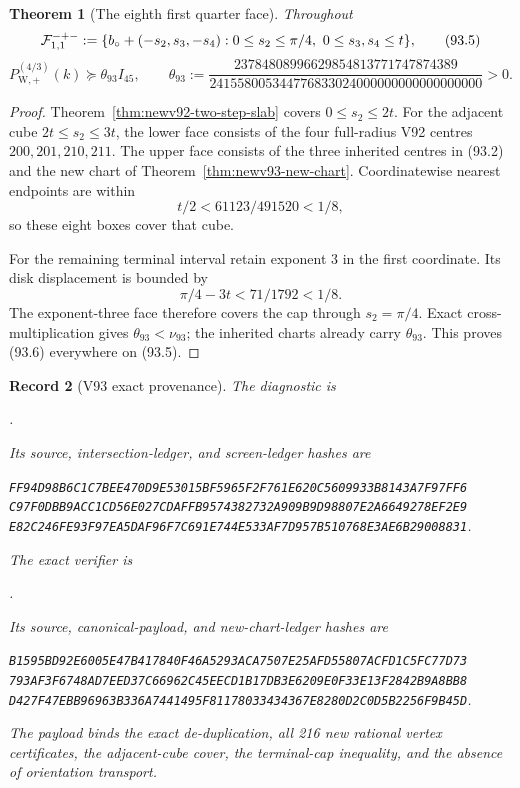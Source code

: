 \documentclass[11pt,oneside]{article}
\newtheorem{theorem}{Theorem}[section]
\newtheorem{record}[theorem]{Record}
\theoremstyle{definition}
\theoremstyle{remark}
\begin{document}
\begin{theorem}[The eighth first quarter face]
\label{thm:newv93-first-quarter-face}
Throughout
\[
 {\cal F}^{-+-}_{1,1}:=
 \{b_\circ+(-s_2,s_3,-s_4):
 0\leq s_2\leq\pi/4,\ 0\leq s_3,s_4\leq t\},         \tag{93.5}
\]
\[
 P_{\mathrm W,+}^{(4/3)}(k)
 \succeq\theta_{93}I_{45},\qquad
 \theta_{93}:=
 \frac{23784808996629854813771747874389}
 {241558005344776833024000000000000000000}>0.         \tag{93.6}
\]
\end{theorem}

\begin{proof}
Theorem~\ref{thm:newv92-two-step-slab} covers
\(0\leq s_2\leq2t\).  For the adjacent cube
\(2t\leq s_2\leq3t\), the lower face consists of the four
full-radius V92 centres \(200,201,210,211\).  The upper face
consists of the three inherited centres in (93.2) and the new chart
of Theorem~\ref{thm:newv93-new-chart}.  Coordinatewise nearest
endpoints are within
\[
 t/2<61123/491520<1/8,                               \tag{93.7}
\]
so these eight boxes cover that cube.

For the remaining terminal interval retain exponent \(3\) in the
first coordinate.  Its disk displacement is bounded by
\[
 \pi/4-3t<71/1792<1/8.                               \tag{93.8}
\]
The exponent-three face therefore covers the cap through
\(s_2=\pi/4\).  Exact cross-multiplication gives
\(\theta_{93}<\nu_{93}\); the inherited charts already carry
\(\theta_{93}\).  This proves (93.6) everywhere on (93.5).
\end{proof}

\begin{record}[V93 exact provenance]
\label{rec:newv93-provenance}
The diagnostic is
\begin{center}\footnotesize
{}.
\end{center}
Its source, intersection-ledger, and screen-ledger hashes are
\begin{center}\scriptsize
\texttt{FF94D98B6C1C7BEE470D9E53015BF5965F2F761E620C5609933B8143A7F97FF6}\\
\texttt{C97F0DBB9ACC1CD56E027CDAFFB9574382732A909B9D98807E2A6649278EF2E9}\\
\texttt{E82C246FE93F97EA5DAF96F7C691E744E533AF7D957B510768E3AE6B29008831}.
\end{center}
The exact verifier is
\begin{center}\footnotesize
{}.
\end{center}
Its source, canonical-payload, and new-chart-ledger hashes are
\begin{center}\scriptsize
\texttt{B1595BD92E6005E47B417840F46A5293ACA7507E25AFD55807ACFD1C5FC77D73}\\
\texttt{793AF3F6748AD7EED37C66962C45EECD1B17DB3E6209E0F33E13F2842B9A8BB8}\\
\texttt{D427F47EBB96963B336A7441495F81178033434367E8280D2C0D5B2256F9B45D}.
\end{center}
The payload binds the exact de-duplication, all 216 new rational
vertex certificates, the adjacent-cube cover, the terminal-cap
inequality, and the absence of orientation transport.
\end{record}
\end{document}
